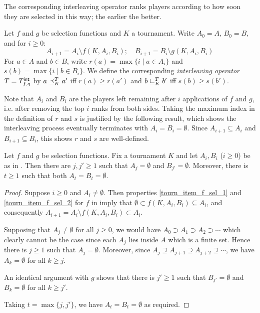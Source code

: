 The corresponding interleaving operator ranks players according to how soon
they are selected in this way; the earlier the better.

\begin{definition}%
    \label{tourn_def_interleaving}

    Let $f$ and $g$ be selection functions and $K$ a tournament. Write $A_0
    = A$, $B_0 = B$, and for $i \ge 0$:
    \[
        A_{i+1} = A_i \setminus f(K, A_i, B_i);
        \quad
        B_{i+1} = B_i \setminus g(K, A_i, B_i)
    \]
    For $a \in A$ and $b \in B$, write $r(a) = \max{\{ i \mid a \in A_i \}}$
    and $s(b) = \max{\{ i \mid b \in B_i \}}$. We define the
    corresponding \emph{interleaving operator} $T = {T_{f,g}^\mathsf{int}}$ by $a
    \preceq_K^T a'$ iff $r(a) \ge r(a')$ and $b \sqsubseteq_K^T b'$ iff $s(b) \ge
    s(b')$.

\end{definition}

Note that $A_i$ and $B_i$ are the players left remaining after $i$ applications
of $f$ and $g$, i.e. after removing the top $i$ ranks from both sides. Taking
the maximum index in the definition of $r$ and $s$ is justified by the
following result, which shows the interleaving process eventually terminates
with $A_i = B_i = \emptyset$. Since $A_{i + 1} \subseteq A_i$ and $B_{i + 1}
\subseteq B_i$, this shows $r$ and $s$ are well-defined.

\begin{proposition}
    \label{tourn_prop_interleaving_terminates}

    Let $f$ and $g$ be selection functions. Fix a tournament $K$ and let $A_i,
    B_i$ ($i \ge 0$) be as in . Then there are $j, j'
    \ge 1$ such that $A_j = \emptyset$ and $B_{j'} = \emptyset$. Moreover,
    there is $t \ge 1$ such that both $A_t = B_t = \emptyset$.

\end{proposition}

\begin{proof}

    Suppose $i \ge 0$ and $A_i \ne \emptyset$. Then properties
    \cref{tourn_item_f_sel_1} and \cref{tourn_item_f_sel_2} for $f$ in
     imply that $\emptyset \subset f(K, A_i, B_i)
    \subseteq A_i$, and consequently $A_{i+1} = A_i \setminus f(K, A_i, B_i)
    \subset A_i$.

    Supposing that $A_j \ne \emptyset$ for all $j \ge 0$, we would have $A_0
    \supset A_1 \supset A_2 \supset \cdots$ which clearly cannot be the case
    since each $A_j$ lies inside $A$ which is a finite set. Hence there is $j
    \ge 1$ such that $A_j = \emptyset$. Moreover, since $A_j \supseteq A_{j+1}
    \supseteq A_{j+2} \supseteq \cdots$, we have $A_k = \emptyset$ for all $k
    \ge j$.

    An identical argument with $g$ shows that there is $j' \ge 1$ such that
    $B_{j'} = \emptyset$ and $B_k = \emptyset$ for all $k \ge j'$.

    Taking $t = \max\{j, j'\}$, we have $A_t = B_t = \emptyset$ as required.
\end{proof}

